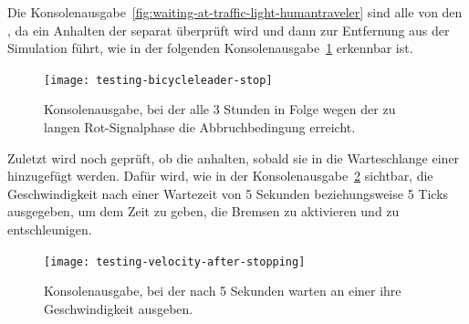 Die Konsolenausgabe~\ref{fig:waiting-at-traffic-light-humantraveler} sind alle von den , da ein Anhalten der  separat überprüft wird und dann zur Entfernung aus der Simulation führt, wie in der folgenden Konsolenausgabe~\ref{fig:waiting-at-traffic-light-bicycleleader} erkennbar ist.

\begin{figure}[h]
    \centering
    \texttt{[image: testing-bicycleleader-stop]}~\caption{Konsolenausgabe, bei der  alle 3 Stunden in Folge wegen der zu langen Rot-Signalphase die Abbruchbedingung erreicht.}
    \label{fig:waiting-at-traffic-light-bicycleleader}
\end{figure}

Zuletzt wird noch geprüft, ob die  anhalten, sobald sie in die Warteschlange einer  hinzugefügt werden.
Dafür wird, wie in der Konsolenausgabe~\ref{fig:human-traveler-slowing-down} sichtbar, die Geschwindigkeit nach einer Wartezeit von 5 Sekunden beziehungsweise 5 Ticks ausgegeben, um dem  Zeit zu geben, die Bremsen zu aktivieren und zu entschleunigen.

\begin{figure}[h]
    \centering
    \texttt{[image: testing-velocity-after-stopping]}~\caption{Konsolenausgabe, bei der  nach 5 Sekunden warten an einer  ihre Geschwindigkeit ausgeben.}
    \label{fig:human-traveler-slowing-down}
\end{figure}
